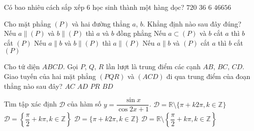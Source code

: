 \begin{ex}%
	Có bao nhiêu cách sắp xếp $6$ học sinh thành một hàng dọc?
	\choice
	{\True $720$}
	{$36$}
	{$6$}
	{$46656$}
\end{ex}
\begin{ex}%
	Cho mặt phẳng $(P)$ và hai đường thẳng $a$, $b$. Khẳng định nào sau đây đúng?
	\choice
	{Nếu $a \parallel (P)$ và $b \parallel (P)$ thì $a$ và $b$ đồng phẳng}
	{Nếu $a\subset (P)$ và $b$ cắt $a$ thì $b$ cắt $(P)$}
	{Nếu $a \parallel b$ và $b \parallel (P)$ thì $a\parallel (P)$}
	{\True Nếu $a \parallel b$ và $(P)$ cắt $a$ thì $b$ cắt $(P)$}
\end{ex}
\begin{ex}%
	Cho tứ diện $ABCD$. Gọi $P$, $Q$, $R$ lần lượt là trung điểm các cạnh $AB$, $BC$, $CD$. Giao tuyến của hai mặt phẳng $(PQR)$ và $(ACD)$ đi qua trung điểm của đoạn thẳng nào sau đây?
	\choice
	{$AC$}
	{\True $AD$}
	{$PR$}
	{$BD$}
\end{ex}
\begin{ex}%
	Tìm tập xác định $\mathscr D$ của hàm số $y=\dfrac{\sin x}{\cos {2x}+1}$.
	\choice
	{$\mathscr D=\mathbb{R}\setminus \{\pi +k2\pi, k\in \mathbb{Z}\}$}
	{$\mathscr D=\left\{\dfrac{\pi}{2} +k\pi, k\in \mathbb{Z}\right\}$}
	{$\mathscr D=\{\pi +k2\pi, k\in \mathbb{Z}\}$}
	{\True $\mathscr D=\mathbb{R}\setminus \left\{\dfrac{\pi}{2} +k\pi, k\in \mathbb{Z}\right\}$}
\end{ex}
